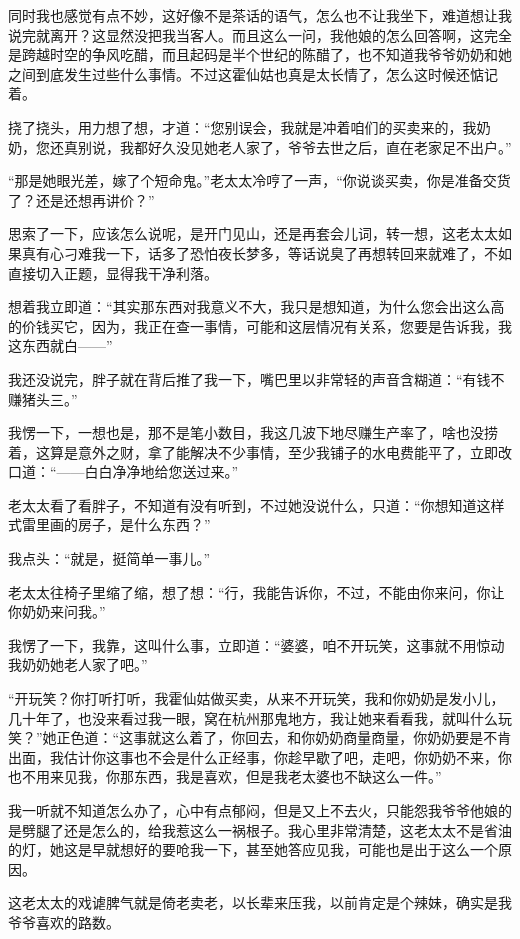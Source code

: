 同时我也感觉有点不妙，这好像不是茶话的语气，怎么也不让我坐下，难道想让我说完就离开？这显然没把我当客人。而且这么一问，我他娘的怎么回答啊，这完全是跨越时空的争风吃醋，而且起码是半个世纪的陈醋了，也不知道我爷爷奶奶和她之间到底发生过些什么事情。不过这霍仙姑也真是太长情了，怎么这时候还惦记着。

挠了挠头，用力想了想，才道：“您别误会，我就是冲着咱们的买卖来的，我奶奶，您还真别说，我都好久没见她老人家了，爷爷去世之后，直在老家足不出户。”

“那是她眼光差，嫁了个短命鬼。”老太太冷哼了一声，“你说谈买卖，你是准备交货了？还是还想再讲价？”

思索了一下，应该怎么说呢，是开门见山，还是再套会儿词，转一想，这老太太如果真有心刁难我一下，话多了恐怕夜长梦多，等话说臭了再想转回来就难了，不如直接切入正题，显得我干净利落。

想着我立即道：“其实那东西对我意义不大，我只是想知道，为什么您会出这么高的价钱买它，因为，我正在查一事情，可能和这层情况有关系，您要是告诉我，我这东西就白——”

我还没说完，胖子就在背后推了我一下，嘴巴里以非常轻的声音含糊道：“有钱不赚猪头三。”

我愣一下，一想也是，那不是笔小数目，我这几波下地尽赚生产率了，啥也没捞着，这算是意外之财，拿了能解决不少事情，至少我铺子的水电费能平了，立即改口道：“——白白净净地给您送过来。”

老太太看了看胖子，不知道有没有听到，不过她没说什么，只道：“你想知道这样式雷里画的房子，是什么东西？”

我点头：“就是，挺简单一事儿。”

老太太往椅子里缩了缩，想了想：“行，我能告诉你，不过，不能由你来问，你让你奶奶来问我。”

我愣了一下，我靠，这叫什么事，立即道：“婆婆，咱不开玩笑，这事就不用惊动我奶奶她老人家了吧。”

“开玩笑？你打听打听，我霍仙姑做买卖，从来不开玩笑，我和你奶奶是发小儿，几十年了，也没来看过我一眼，窝在杭州那鬼地方，我让她来看看我，就叫什么玩笑？”她正色道：“这事就这么着了，你回去，和你奶奶商量商量，你奶奶要是不肯出面，我估计你这事也不会是什么正经事，你趁早歇了吧，走吧，你奶奶不来，你也不用来见我，你那东西，我是喜欢，但是我老太婆也不缺这么一件。”

我一听就不知道怎么办了，心中有点郁闷，但是又上不去火，只能怨我爷爷他娘的是劈腿了还是怎么的，给我惹这么一祸根子。我心里非常清楚，这老太太不是省油的灯，她这是早就想好的要呛我一下，甚至她答应见我，可能也是出于这么一个原因。

这老太太的戏谑脾气就是倚老卖老，以长辈来压我，以前肯定是个辣妹，确实是我爷爷喜欢的路数。

